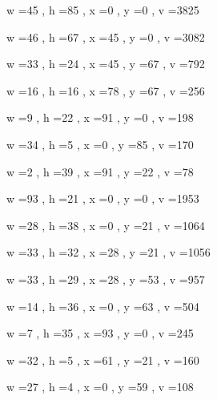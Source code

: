 \documentclass[11pt]{article}
\begin{document}
w =45 , h =85 , x =0 , y =0 , v =3825
\par
w =46 , h =67 , x =45 , y =0 , v =3082
\par
w =33 , h =24 , x =45 , y =67 , v =792
\par
w =16 , h =16 , x =78 , y =67 , v =256
\par
w =9 , h =22 , x =91 , y =0 , v =198
\par
w =34 , h =5 , x =0 , y =85 , v =170
\par
w =2 , h =39 , x =91 , y =22 , v =78
\par
\newpage




w =93 , h =21 , x =0 , y =0 , v =1953
\par
w =28 , h =38 , x =0 , y =21 , v =1064
\par
w =33 , h =32 , x =28 , y =21 , v =1056
\par
w =33 , h =29 , x =28 , y =53 , v =957
\par
w =14 , h =36 , x =0 , y =63 , v =504
\par
w =7 , h =35 , x =93 , y =0 , v =245
\par
w =32 , h =5 , x =61 , y =21 , v =160
\par
w =27 , h =4 , x =0 , y =59 , v =108
\par
\newpage
\end{document}
